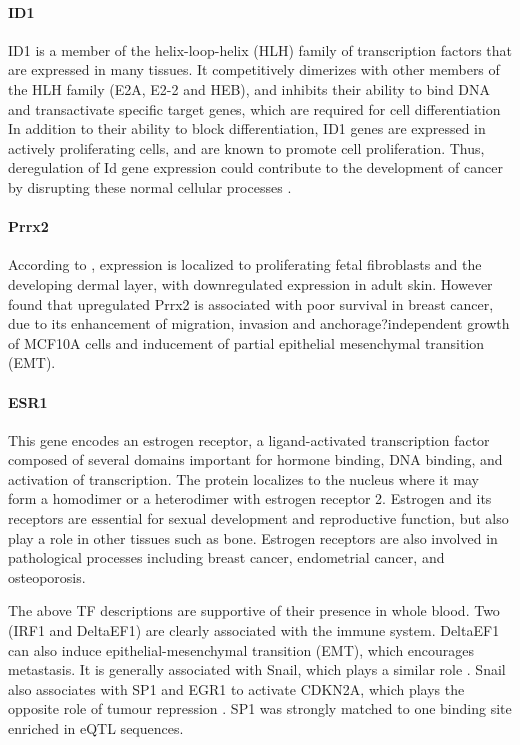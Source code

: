 \documentclass[12pt]{article}
\begin{document}
\paragraph{ID1}

ID1 is a member of the helix-loop-helix (HLH) family of transcription factors that are expressed in many tissues. It competitively dimerizes with other members of the HLH family (E2A, E2-2 and HEB), and inhibits their ability to bind DNA and transactivate specific target genes, which are required for cell differentiation In addition to their ability to block differentiation, ID1 genes are expressed in actively proliferating cells, and are known to promote cell proliferation. Thus, deregulation of Id gene expression could contribute to the development of cancer by disrupting these normal cellular processes \citep{Suh2008}. 

\paragraph{Prrx2}

According to \citet{Weizmann2018}, expression is localized to proliferating fetal fibroblasts and the developing dermal layer, with downregulated expression in adult skin. However \citet{juang2016} found that upregulated Prrx2 is associated with poor survival in breast cancer, due to its enhancement of migration, invasion and anchorage?independent growth of MCF10A cells and inducement of partial epithelial mesenchymal transition (EMT).

\paragraph{ESR1}

This gene encodes an estrogen receptor, a ligand-activated transcription factor composed of several domains important for hormone binding, DNA binding, and activation of transcription. The protein localizes to the nucleus where it may form a homodimer or a heterodimer with estrogen receptor 2. Estrogen and its receptors are essential for sexual development and reproductive function, but also play a role in other tissues such as bone. Estrogen receptors are also involved in pathological processes including breast cancer, endometrial cancer, and osteoporosis.


The above TF descriptions are supportive of their presence in whole blood. Two (IRF1 and DeltaEF1) are clearly associated with the immune system. DeltaEF1 can also induce epithelial-mesenchymal transition (EMT), which encourages metastasis. It is generally associated with Snail, which plays a similar role \citep{Bourcy2018}. Snail also associates with SP1 and EGR1 to activate CDKN2A, which plays the opposite role of tumour repression \citep{Hu2010}. SP1 was strongly matched to one binding site enriched in eQTL sequences.
\end{document}
